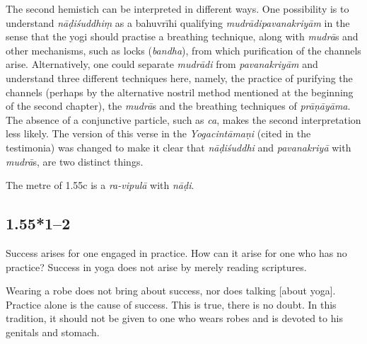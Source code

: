 \begin{ekdosis}
\begin{testimonia}[hp01_055]
\begin{versinnote}
\tl{\var{nāḍiśuddhiṃ ] \emph{em.}, nāhiśuddhi ms. no. 2244}\\!}
\end{versinnote}

\end{testimonia}

\begin{philcomm}[hp01_055]
The second hemistich can be interpreted in different ways. One possibility is to understand \emph{nāḍiśuddhiṃ} as a bahuvrīhi qualifying \emph{mudrādipavanakriyām} in the sense that the yogi should practise a breathing technique, along with \emph{mudrā}s and other mechanisms, such as locks (\emph{bandha}), from which purification of the channels arise. Alternatively, one could separate \emph{mudrādi} from \emph{pavanakriyām} and understand three different techniques here, namely, the practice of purifying the channels (perhaps by the alternative nostril method mentioned at the beginning of the second chapter), the \emph{mudrā}s and the breathing techniques of \emph{prāṇāyāma}. The absence of a conjunctive particle, such as \emph{ca}, makes the second interpretation less likely. The version of this verse in the \emph{Yogacintāmaṇi} (cited in the testimonia) was changed to make it clear that \emph{nāḍiśuddhi} and \emph{pavanakriyā} with \emph{mudrā}s, are two distinct things. 

The metre of 1.55c is a \emph{ra-vipulā} with \emph{nāḍi}.
\end{philcomm}

\subsection*{1.55*1--2}
\begin{translation}[hp01_055_1]
Success arises for one engaged in practice. How can it arise for one who has no practice? Success in yoga does not arise by merely reading scriptures.
\end{translation}

\begin{translation}[hp01_055_2]
Wearing a robe does not bring about success, nor does talking [about yoga]. Practice alone is the cause of success. This is true, there is no doubt. In this tradition, it should not be given to one who wears robes and is devoted to his genitals and stomach.
\end{translation}


\end{ekdosis}
